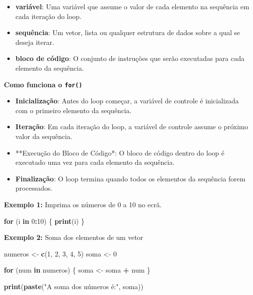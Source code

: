 \documentclass[
]{book}
\newenvironment{Shaded}{\begin{snugshade}}{\end{snugshade}}
\newcommand{\ControlFlowTok}[1]{\textcolor[rgb]{0.13,0.29,0.53}{\textbf{#1}}}
\newcommand{\DecValTok}[1]{\textcolor[rgb]{0.00,0.00,0.81}{#1}}
\newcommand{\FunctionTok}[1]{\textcolor[rgb]{0.13,0.29,0.53}{\textbf{#1}}}
\newcommand{\NormalTok}[1]{#1}
\newcommand{\OtherTok}[1]{\textcolor[rgb]{0.56,0.35,0.01}{#1}}
\newcommand{\SpecialCharTok}[1]{\textcolor[rgb]{0.81,0.36,0.00}{\textbf{#1}}}
\newcommand{\StringTok}[1]{\textcolor[rgb]{0.31,0.60,0.02}{#1}}
\begin{document}
\begin{itemize}
\item
  \textbf{variável}: Uma variável que assume o valor de cada elemento na sequência em cada iteração do loop.
\item
  \textbf{sequência}: Um vetor, lista ou qualquer estrutura de dados sobre a qual se deseja iterar.
\item
  \textbf{bloco de código}: O conjunto de instruções que serão executadas para cada elemento da sequência.
\end{itemize}

\textbf{Como funciona o \texttt{for()}}

\begin{itemize}
\item
  \textbf{Inicialização}: Antes do loop começar, a variável de controle é inicializada com o primeiro elemento da sequência.
\item
  \textbf{Iteração}: Em cada iteração do loop, a variável de controle assume o próximo valor da sequência.
\item
  **Execução do Bloco de Código*: O bloco de código dentro do loop é executado uma vez para cada elemento da sequência.
\item
  \textbf{Finalização}: O loop termina quando todos os elementos da sequência forem processados.
\end{itemize}

\textbf{Exemplo 1:} Imprima os números de 0 a 10 no ecrã.

\begin{Shaded}
\begin{Highlighting}[]
\ControlFlowTok{for}\NormalTok{ (i }\ControlFlowTok{in} \DecValTok{0}\SpecialCharTok{:}\DecValTok{10}\NormalTok{) \{}
  \FunctionTok{print}\NormalTok{(i)}
\NormalTok{\}}
\end{Highlighting}
\end{Shaded}

\textbf{Exemplo 2:} Soma dos elementos de um vetor

\begin{Shaded}
\begin{Highlighting}[]
\NormalTok{numeros }\OtherTok{\textless{}{-}} \FunctionTok{c}\NormalTok{(}\DecValTok{1}\NormalTok{, }\DecValTok{2}\NormalTok{, }\DecValTok{3}\NormalTok{, }\DecValTok{4}\NormalTok{, }\DecValTok{5}\NormalTok{)}
\NormalTok{soma }\OtherTok{\textless{}{-}} \DecValTok{0}

\ControlFlowTok{for}\NormalTok{ (num }\ControlFlowTok{in}\NormalTok{ numeros) \{}
\NormalTok{  soma }\OtherTok{\textless{}{-}}\NormalTok{ soma }\SpecialCharTok{+}\NormalTok{ num}
\NormalTok{\}}

\FunctionTok{print}\NormalTok{(}\FunctionTok{paste}\NormalTok{(}\StringTok{"A soma dos números é:"}\NormalTok{, soma))}
\end{Highlighting}
\end{Shaded}
\end{document}
